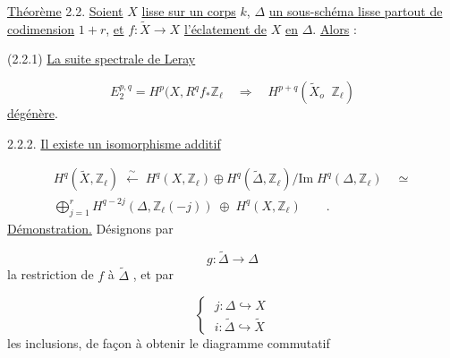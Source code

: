 \underline{Théorème} 2.2.  \underline{Soient} $X$ \underline{lisse sur un corps} $k$, $\Delta$ \underline{un sous-schéma lisse partout de codimension} $1 + r$, \underline{et} $f : \widetilde{X} \longrightarrow X$ \underline{l'éclatement de} $X$ \underline{en} $\Delta$. \underline{Alors} :

(2.2.1) \underline{La suite spectrale de Leray}

\begin{equation*}
E_2^{p,q} = H^p(X, R^q f_* \mathbb{Z}_\ell \quad \Longrightarrow \quad H^{p+q}(\widetilde{X}_o \;\; \mathbb{Z}_\ell)
\end{equation*}
\underline{dégénère}.



2.2.2.  \underline{Il existe un isomorphisme additif}

\begin{equation*}
\begin{gathered}
H^q(\widetilde{X}, \mathbb{Z}_\ell) \;\overset{\sim}{\longleftarrow}\; H^q(X, \mathbb{Z}_\ell) \oplus H^q(\widetilde{\Delta}, \mathbb{Z}_\ell)/\mathrm{Im}\; H^q(\Delta, \mathbb{Z}_\ell) \quad \simeq \\
\bigoplus_{j=1}^{r} H^{q-2j}(\Delta, \mathbb{Z}_\ell(-j)) \;\oplus\; H^q(X, \mathbb{Z}_\ell) \qquad .
\end{gathered}
\end{equation*}
\underline{Démonstration.}  Désignons par

\begin{equation}\tag{2.2.3}
g : \widetilde{\Delta} \longrightarrow \Delta
\end{equation}
la restriction de $f$ à $\widetilde{\Delta}$ , et par

\begin{equation}\tag{2.2.4}
\left\{\;
\begin{array}{l}
j : \Delta \hookrightarrow X \\[6ex]
i : \widetilde{\Delta} \hookrightarrow \widetilde{X}
\end{array}
\right.
\end{equation}
les inclusions, de façon à obtenir le diagramme commutatif

